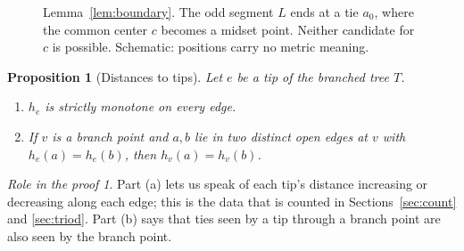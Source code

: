\documentclass[11pt]{amsart}
\newtheorem{proposition}[theorem]{Proposition}
\theoremstyle{definition}
\theoremstyle{remark}
\newtheorem*{role}{Role in the proof}
\newcommand{\M}{M}
\begin{document}
\begin{figure}[ht]
\centering
{}
\caption{Lemma~\ref{lem:boundary}. The odd segment $L$ ends at a tie $a_0$, where the common center $c$ becomes a midset point. Neither candidate for $c$ is possible. Schematic: positions carry no metric meaning.}\label{fig:boundary}
\end{figure}

\begin{proposition}[Distances to tips]\label{prop:tipdistance}
Let $e$ be a tip of the branched tree $T$.
\begin{enumerate}[label=\textup{(\alph*)}]
\item $h_e$ is strictly monotone on every edge.
\item If $v$ is a branch point and $a,b$ lie in two distinct open edges at $v$ with $h_e(a)=h_e(b)$, then $h_v(a)=h_v(b)$.
\end{enumerate}
\end{proposition}

\begin{role}
Part (a) lets us speak of each tip's distance increasing or decreasing along each edge; this is the data that is counted in Sections~\ref{sec:count} and \ref{sec:triod}. Part (b) says that ties seen by a tip through a branch point are also seen by the branch point.
\end{role}
\end{document}
